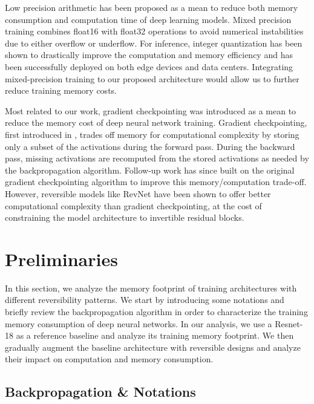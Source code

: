 \documentclass[twocolumn]{bmcart}
\begin{document}
Low precision arithmetic has been proposed as a mean to reduce both memory consumption and computation time of deep learning models. Mixed precision training \cite{micikevicius2017mixed} combines float16 with float32 operations to avoid numerical instabilities due to either overflow or underflow.
For inference,  integer quantization \cite{jacob2018quantization,wu2018training} has been shown to drastically improve the computation and memory efficiency and has been successfully deployed on both edge devices and data centers.
Integrating mixed-precision training to our proposed architecture would allow us to further reduce training memory costs. 

Most related to our work, gradient checkpointing was introduced as a mean to reduce the memory cost of deep neural network training.
Gradient checkpointing, first introduced in \cite{martens2012training}, trades off memory for computational complexity by storing only a subset of the activations during the forward pass.
During the backward pass, missing activations are recomputed from the stored activations as needed by the backpropagation algorithm.
Follow-up work \cite{chen2016training} has since built on the original gradient checkpointing algorithm to improve this memory/computation trade-off.  
However, reversible models like RevNet have been shown to offer better computational complexity than gradient checkpointing,
at the cost of constraining the model architecture to invertible residual blocks.

\section{Preliminaries}

In this section, we analyze the memory footprint of training architectures with different reversibility patterns.
We start by introducing some notations and briefly review the backpropagation algorithm
in order to characterize the training memory consumption of deep neural networks. 
In our analysis, we use a Resnet-18 as a reference baseline and analyze its training memory footprint.
We then gradually augment the baseline architecture with reversible designs and analyze their impact on computation and memory consumption.

\subsection{Backpropagation \& Notations}
\end{document}
